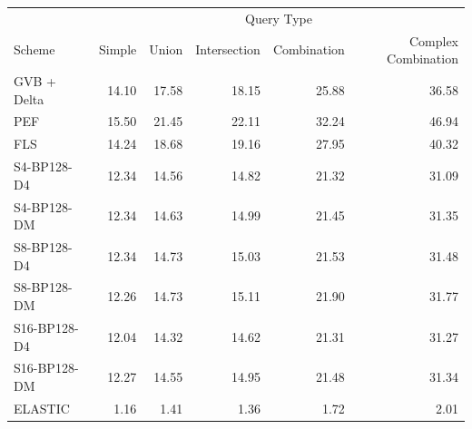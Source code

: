 \begin{tabular}{lrrrrr}
\toprule
 & \multicolumn{5}{c}{Query Type} \\
Scheme & Simple & Union & Intersection & Combination & Complex Combination \\
\midrule
GVB + Delta & 14.10 & 17.58 & 18.15 & 25.88 & 36.58 \\
PEF & 15.50 & 21.45 & 22.11 & 32.24 & 46.94 \\
FLS & 14.24 & 18.68 & 19.16 & 27.95 & 40.32 \\
S4-BP128-D4 & 12.34 & 14.56 & 14.82 & 21.32 & 31.09 \\
S4-BP128-DM & 12.34 & 14.63 & 14.99 & 21.45 & 31.35 \\
S8-BP128-D4 & 12.34 & 14.73 & 15.03 & 21.53 & 31.48 \\
S8-BP128-DM & 12.26 & 14.73 & 15.11 & 21.90 & 31.77 \\
S16-BP128-D4 & 12.04 & 14.32 & 14.62 & 21.31 & 31.27 \\
S16-BP128-DM & 12.27 & 14.55 & 14.95 & 21.48 & 31.34 \\
ELASTIC & 1.16 & 1.41 & 1.36 & 1.72 & 2.01 \\
\bottomrule
\end{tabular}
